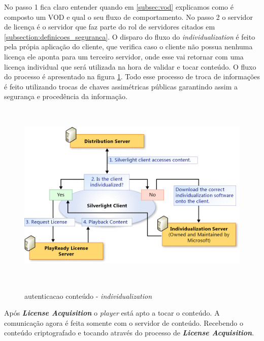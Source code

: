 No passo 1 fica claro entender quando em \ref{subsec:vod} explicamos como \'e composto um VOD e qual o seu fluxo de comportamento.
\newline
No passo 2 o servidor de licen\c{c}a \'e o servidor que faz parte do rol de servidores citados em \ref{subsection:definicoes_seguranca}. O disparo do fluxo do \textit{individualization} \'e feito pela pr\'opia aplica\c{c}\~ao do cliente, que verifica caso o cliente n\~ao possua nenhuma licen\c{c}a ele aponta para um terceiro servidor, onde esse vai retornar com uma licen\c{c}a individual que ser\'a utilizada na hora de validar e tocar conte\'udo. O fluxo do processo \'e apresentado na figura \ref{figura:individualization}. 
\newline
Todo esse processo de troca de informa\c{c}\~oes \'e feito utilizando trocas de chaves assim\'etricas p\'ublicas garantindo assim a seguran\c{c}a e proced\^encia da informa\c{c}\~ao.
\begin{figure}[H]
\caption{autenticacao conte\'udo - \textit{individualization}}
\includegraphics[height=9cm]{Figuras/autenticacao_conteudo_individualization.png} 
\label{figura:individualization}
\end{figure}
Ap\'os \textbf{\textit{License Acquisition}} o \textit{player} est\'a apto a tocar o conte\'udo. A comunica\c{c}\~ao agora \'e feita somente com o servidor de conte\'udo. Recebendo o conte\'udo criptografado e tocando atrav\'es do processo de \textbf{\textit{License Acquisition}}.